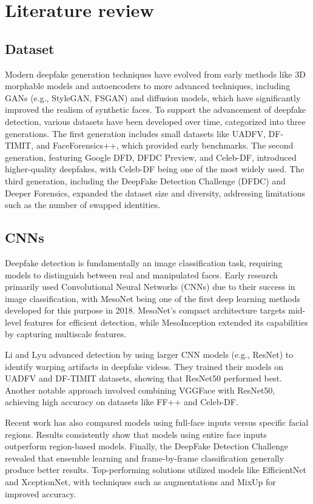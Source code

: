 \documentclass[conference]{IEEEtran}
\begin{document}
		
		
		\section{Literature review}
		
		\subsection{Dataset}
		Modern deepfake generation techniques have evolved from early methods like 3D morphable models and autoencoders to more advanced techniques, including GANs (e.g., StyleGAN, FSGAN) and diffusion models, which have significantly improved the realism of synthetic faces. To support the advancement of deepfake detection, various datasets have been developed over time, categorized into three generations. The first generation includes small datasets like UADFV, DF-TIMIT, and FaceForensics++, which provided early benchmarks. The second generation, featuring Google DFD, DFDC Preview, and Celeb-DF, introduced higher-quality deepfakes, with Celeb-DF being one of the most widely used. The third generation, including the DeepFake Detection Challenge (DFDC) and Deeper Forensics, expanded the dataset size and diversity, addressing limitations such as the number of swapped identities.
		
		
		\subsection{CNNs}
		Deepfake detection is fundamentally an image classification task, requiring models to distinguish between real and manipulated faces. Early research primarily used Convolutional Neural Networks (CNNs) due to their success in image classification, with MesoNet being one of the first deep learning methods developed for this purpose in 2018. MesoNet's compact architecture targets mid-level features for efficient detection, while MesoInception extended its capabilities by capturing multiscale features.
		
		Li and Lyu advanced detection by using larger CNN models (e.g., ResNet) to identify warping artifacts in deepfake videos. They trained their models on UADFV and DF-TIMIT datasets, showing that ResNet50 performed best. Another notable approach involved combining VGGFace with ResNet50, achieving high accuracy on datasets like FF++ and Celeb-DF.
		
		Recent work has also compared models using full-face inputs versus specific facial regions. Results consistently show that models using entire face inputs outperform region-based models. Finally, the DeepFake Detection Challenge revealed that ensemble learning and frame-by-frame classification generally produce better results. Top-performing solutions utilized models like EfficientNet and XceptionNet, with techniques such as augmentations and MixUp for improved accuracy.
		
\end{document}
